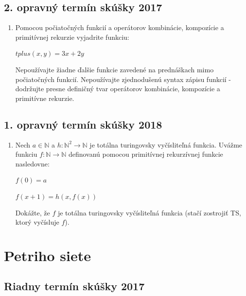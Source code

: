 \documentclass[11pt,a4paper]{article}
\begin{document}
		\subsection{2. opravný termín skúšky 2017}

		\begin{enumerate}
			\item Pomocou počiatočných funkcií a operátorov kombinácie, kompozície a primitívnej rekurzie vyjadrite funkciu:

			$tplus(x,y) = 3x + 2y$
	
			Nepoužívajte žiadne ďalšie funkcie zavedené na prednáškach mimo počiatočných funkcií. Nepoužívajte zjednodušenú syntax zápisu funkcií \-- dodržujte presne definičný tvar operátorov kombinácie, kompozície a primitívne rekurzie.
		\end{enumerate}	
	
		\subsection{1. opravný termín skúšky 2018}
		
		\begin{enumerate}
			\item Nech $a \in \mathbb{N}$ a $h: \mathbb{N}^2 \rightarrow \mathbb{N}$ je totálna turingovsky vyčísliteľná funkcia. Uvážme funkciu $f: \mathbb{N} \rightarrow \mathbb{N}$ definovanú pomocou primitívnej rekurzívnej funkcie nasledovne:
			
			$f(0) = a$
			
			$f(x+1) = h(x, f(x))$
			
			Dokážte, že $f$ je totálna turingovsky vyčísliteľná funkcia (stačí zostrojiť TS, ktorý vyčísluje $f$).
			
		\end{enumerate}	

	\section{Petriho siete}

		\subsection{Riadny termín skúšky 2017}
\end{document}
